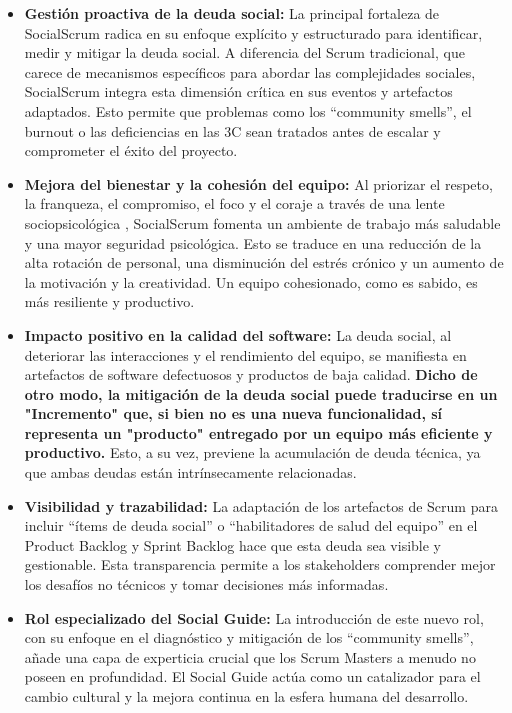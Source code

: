 \begin{itemize}
    \item \textbf{Gestión proactiva de la deuda social:} La principal fortaleza de SocialScrum radica en su enfoque explícito y estructurado para identificar, medir y mitigar la deuda social. A diferencia del Scrum tradicional, que carece de mecanismos específicos para abordar las complejidades sociales, SocialScrum integra esta dimensión crítica en sus eventos y artefactos adaptados. Esto permite que problemas como los ``community smells'', el burnout o las deficiencias en las 3C sean tratados antes de escalar y comprometer el éxito del proyecto.
    \item \textbf{Mejora del bienestar y la cohesión del equipo:} Al priorizar el respeto, la franqueza, el compromiso, el foco y el coraje a través de una lente sociopsicológica \cite{maslow1943motivation}, SocialScrum fomenta un ambiente de trabajo más saludable y una mayor seguridad psicológica. Esto se traduce en una reducción de la alta rotación de personal, una disminución del estrés crónico y un aumento de la motivación y la creatividad. Un equipo cohesionado, como es sabido, es más resiliente y productivo.
    \item \textbf{Impacto positivo en la calidad del software:} La deuda social, al deteriorar las interacciones y el rendimiento del equipo, se manifiesta en artefactos de software defectuosos y productos de baja calidad. \textbf{Dicho de otro modo, la mitigación de la deuda social puede traducirse en un "Incremento" que, si bien no es una nueva funcionalidad, sí representa un "producto" entregado por un equipo más eficiente y productivo.} Esto, a su vez, previene la acumulación de deuda técnica, ya que ambas deudas están intrínsecamente relacionadas.
    \item \textbf{Visibilidad y trazabilidad:} La adaptación de los artefactos de Scrum para incluir ``ítems de deuda social'' o ``habilitadores de salud del equipo'' en el Product Backlog y Sprint Backlog hace que esta deuda sea visible y gestionable. Esta transparencia permite a los stakeholders comprender mejor los desafíos no técnicos y tomar decisiones más informadas.
    \item \textbf{Rol especializado del Social Guide:} La introducción de este nuevo rol, con su enfoque en el diagnóstico y mitigación de los ``community smells'', añade una capa de experticia crucial que los Scrum Masters a menudo no poseen en profundidad. El Social Guide actúa como un catalizador para el cambio cultural y la mejora continua en la esfera humana del desarrollo.
\end{itemize}

